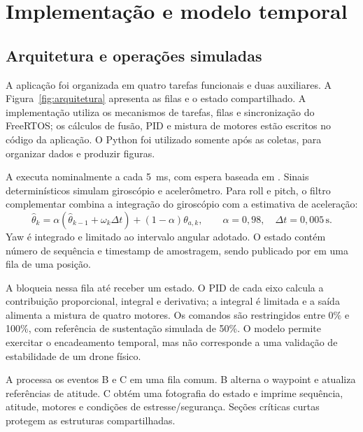 \section{Implementação e modelo temporal}
\label{sec:implementacao}

\subsection{Arquitetura e operações simuladas}

A aplicação foi organizada em quatro tarefas funcionais e duas auxiliares. A Figura~\ref{fig:arquitetura} apresenta as filas e o estado compartilhado. A implementação utiliza os mecanismos de tarefas, filas e sincronização do FreeRTOS; os cálculos de fusão, PID e mistura de motores estão escritos no código da aplicação. O Python foi utilizado somente após as coletas, para organizar dados e produzir figuras.


A  executa nominalmente a cada 5~ms, com espera baseada em . Sinais determinísticos simulam giroscópio e acelerômetro. Para roll e pitch, o filtro complementar combina a integração do giroscópio com a estimativa de aceleração:
\begin{equation}
\widehat{\theta}_k=\alpha(\widehat{\theta}_{k-1}+\omega_k\Delta t)+(1-\alpha)\theta_{a,k},
\qquad \alpha=0{,}98,\quad\Delta t=0{,}005\,\mathrm{s}.
\end{equation}
Yaw é integrado e limitado ao intervalo angular adotado. O estado contém número de sequência e timestamp de amostragem, sendo publicado por  em uma fila de uma posição.

A  bloqueia nessa fila até receber um estado. O PID de cada eixo calcula a contribuição proporcional, integral e derivativa; a integral é limitada e a saída alimenta a mistura de quatro motores. Os comandos são restringidos entre 0\% e 100\%, com referência de sustentação simulada de 50\%. O modelo permite exercitar o encadeamento temporal, mas não corresponde a uma validação de estabilidade de um drone físico.

A  processa os eventos B e C em uma fila comum. B alterna o waypoint e atualiza referências de atitude. C obtém uma fotografia do estado e imprime sequência, atitude, motores e condições de estresse/segurança. Seções críticas curtas protegem as estruturas compartilhadas.


